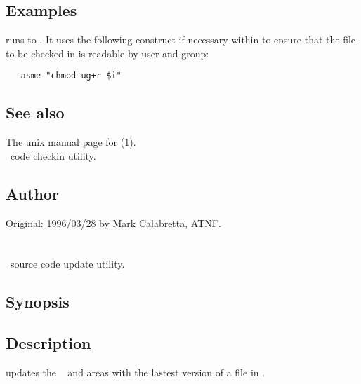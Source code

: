 \subsection*{Examples}
 
 runs  to .  It uses the following
construct if necessary within to ensure that the file to be checked in is
readable by user and group:

\begin{verbatim}
   asme "chmod ug+r $i"
\end{verbatim}
 
 
\subsection*{See also}
 
The unix manual page for (1).\\
 \aipspp\ code checkin utility.
 
\subsection*{Author}
 
Original: 1996/03/28 by Mark Calabretta, ATNF.


\newpage
\section{}
\label{au}

\aipspp\ source code update utility.

\subsection*{Synopsis}

\begin{synopsis}
\end{synopsis}

\subsection*{Description}

 updates the \aipspp\  and  areas with the
lastest version of a file in .


